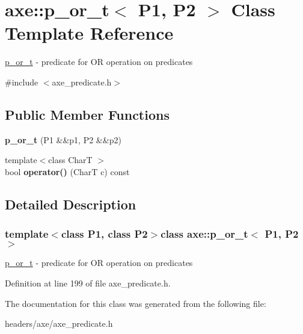 \hypertarget{classaxe_1_1p__or__t}{\section{axe\+:\+:p\+\_\+or\+\_\+t$<$ P1, P2 $>$ Class Template Reference}
\label{classaxe_1_1p__or__t}
}


\hyperlink{classaxe_1_1p__or__t}{p\+\_\+or\+\_\+t} -\/ predicate for O\+R operation on predicates  




{\ttfamily \#include $<$axe\+\_\+predicate.\+h$>$}

\subsection*{Public Member Functions}
\begin{DoxyCompactItemize}
\item 
\hypertarget{classaxe_1_1p__or__t_a0572abef1d8bfe2242f993e3339ead8d}{{\bfseries p\+\_\+or\+\_\+t} (P1 \&\&p1, P2 \&\&p2)}\label{classaxe_1_1p__or__t_a0572abef1d8bfe2242f993e3339ead8d}

\item 
\hypertarget{classaxe_1_1p__or__t_a74f6bc4cbd16743e00a0f86c560d321a}{{\footnotesize template$<$class Char\+T $>$ }\\bool {\bfseries operator()} (Char\+T c) const }\label{classaxe_1_1p__or__t_a74f6bc4cbd16743e00a0f86c560d321a}

\end{DoxyCompactItemize}


\subsection{Detailed Description}
\subsubsection*{template$<$class P1, class P2$>$class axe\+::p\+\_\+or\+\_\+t$<$ P1, P2 $>$}

\hyperlink{classaxe_1_1p__or__t}{p\+\_\+or\+\_\+t} -\/ predicate for O\+R operation on predicates 

Definition at line 199 of file axe\+\_\+predicate.\+h.



The documentation for this class was generated from the following file\+:\begin{DoxyCompactItemize}
\item 
headers/axe/axe\+\_\+predicate.\+h\end{DoxyCompactItemize}
